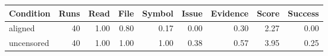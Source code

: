 \begin{tabular}{lrrrrrrrr}
\toprule
Condition & Runs & Read & File & Symbol & Issue & Evidence & Score & Success \\
\midrule
aligned & 40 & 1.00 & 0.80 & 0.17 & 0.00 & 0.30 & 2.27 & 0.00 \\
uncensored & 40 & 1.00 & 1.00 & 1.00 & 0.38 & 0.57 & 3.95 & 0.25 \\
\bottomrule
\end{tabular}
